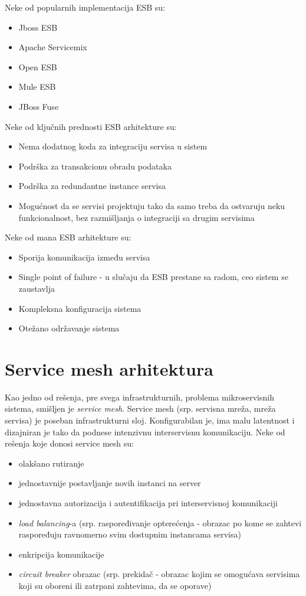 \documentclass[a4paper,12pt]{report}
\begin{document}
Neke od popularnih implementacija ESB su: 
 
\begin{itemize}
	\item Jboss ESB
	\item Apache Servicemix
	\item Open ESB
	\item Mule ESB
	\item JBoss Fuse
\end{itemize}

Neke od ključnih prednosti ESB arhitekture su: 

\begin{itemize}
	\item Nema dodatnog koda za integraciju servisa u sistem
	\item Podrška za transakcionu obradu podataka
	\item Podrška za redundantne instance servisa
	\item Mogućnost da se servisi projektuju tako da samo treba da ostvaruju neku funkcionalnost, bez razmišljanja o integraciji sa drugim servisima
\end{itemize}

Neke od mana ESB arhitekture su: 

\begin{itemize}
	\item Sporija komunikacija između servisa
	\item Single point of failure - u slučaju da ESB prestane sa radom, ceo sistem se zaustavlja
	\item Kompleksna konfiguracija sistema
	\item Otežano održavanje sistema
\end{itemize}


\chapter{Service mesh arhitektura}

Kao jedno od rešenja, pre svega infrastrukturnih, problema mikroservisnih sistema, smišljen je \textit{service mesh}. Service mesh (srp. servisna mreža, mreža servisa) je poseban infrastrukturni sloj. Konfigurabilan je, ima malu latentnost i dizajniran je tako da podnese intenzivnu interservisnu komunikaciju. Neke od rešenja koje donosi service mesh su: 

\begin{itemize}
	\item olakšano rutiranje
	\item jednostavnije postavljanje novih instanci na server
	\item jednostavna autorizacija i autentifikacija pri interservisnoj komunikaciji
	\item \textit{load balancing}-a (srp. raspoređivanje opterećenja - obrazac po kome se zahtevi raspoređuju ravnomerno svim dostupnim instancama servisa)
	\item enkripcija komunikacije
	\item \textit{circuit breaker} obrazac (srp. prekidač - obrazac kojim se omogućava servisima koji su oboreni ili zatrpani zahtevima, da se oporave)
\end{itemize}
\end{document}
